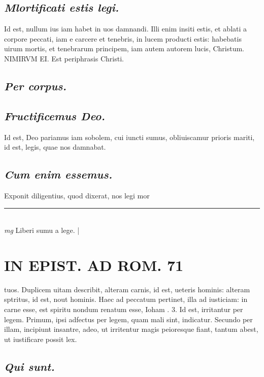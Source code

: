 \documentclass{article}
\begin{document}
\begin{pages}
\subsection*{\textit{Mlortificati estis legi. }}\pstart Id est, nullum ius iam habet in uos damnandi.   \pend\pstart Illi enim insiti estis, et ablati a corpore peccati, iam e carcere et tenebris, in lucem producti estis: habebatis uirum mortis, et tenebrarum principem, iam autem autorem lucis, Christum. NIMIRVM EI. Est periphrasis Christi.   \pend
{}
{}
\subsection*{\textit{Per corpus. }}
{}
\subsection*{\textit{Fructificemus Deo. }}\pstart Id est, Deo pariamus iam sobolem, cui iuncti sumus, obliuiscamur prioris mariti, id est, legis, quae nos damnabat.   \pend
{}
{}
\subsection*{\textit{Cum enim essemus. }}\pstart Exponit diligentius, quod dixerat, nos legi mor\pend
\vspace{0.5cm}\noindent
\vspace{0.2cm}\rule{1cm}{0.2pt}\\ 
\hspace{0.2cm}\textit{mg}
\footnotesize Liberi sumu a lege. 
\normalsize| 
\section*{IN EPIST. AD ROM.  71 }
\marginpar{[ p.]}\pstart tuos. Duplicem uitam describit, alteram carnis, id est, ueteris hominis: alteram sptritus, id est, nout hominis. Haec ad peccatum pertinet, illa ad iusticiam: in carne esse, est spiritu nondum renatum esse, Ioham . 3.   \pend\pstart Id est, irritantur per legem. Primum, ipsi adfectus per legem, quam mali sint, indicatur. Secundo per illam, incipiunt insantre, adeo, ut irritentur magis peioresque fiant, tantum abest, ut iustificare possit lex.   \pend
{}
{}
\subsection*{\textit{Qui sunt. }}
{}

\end{pages}
\end{document}
